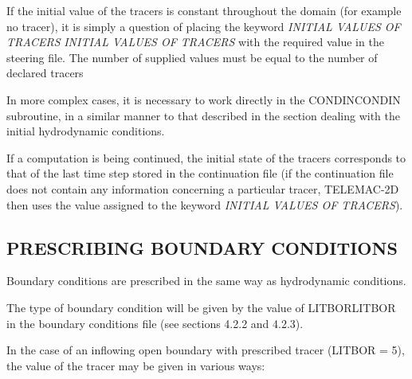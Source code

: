 \documentclass{article} %
\begin{document}
 If the initial value of the tracers is constant throughout the domain (for example no tracer), it is simply a question of placing the keyword \textit{INITIAL VALUES OF TRACERS} \textit{INITIAL VALUES OF TRACERS} with the required value in the steering file. The number of supplied values must be equal to the number of declared tracers

 In more complex cases, it is necessary to work directly in the CONDINCONDIN subroutine, in a similar manner to that described in the section dealing with the initial hydrodynamic conditions.

 If a computation is being continued, the initial state of the tracers corresponds to that of the last time step stored in the continuation file (if the continuation file does not contain any information concerning a particular tracer, TELEMAC-2D then uses the value assigned to the keyword \textit{INITIAL VALUES OF TRACERS}).


\subsection{ PRESCRIBING BOUNDARY CONDITIONS}

 Boundary conditions are prescribed in the same way as hydrodynamic conditions.

 The type of boundary condition will be given by the value of LITBORLITBOR in the boundary conditions file (see sections 4.2.2 and 4.2.3).

 In the case of an inflowing open boundary with prescribed tracer (LITBOR = 5), the value of the tracer may be given in various ways:
\end{document}
